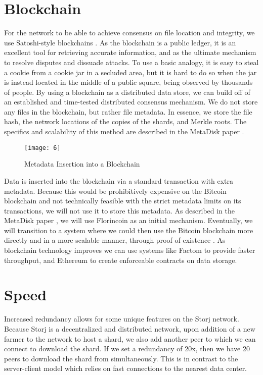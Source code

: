 \documentclass[a4paper,10pt]{article}
\begin{document}
\section{Blockchain}
For the network to be able to achieve consensus on file location and integrity, we use Satoshi-style blockchains \cite{3}. As the blockchain is a public ledger, it is an excellent tool for retrieving accurate information, and as the ultimate mechanism to resolve disputes and dissuade attacks. To use a basic analogy, it is easy to steal a cookie from a cookie jar in a secluded area, but it is hard to do so when the jar is instead located in the middle of a public square, being observed by thousands of people. By using a blockchain as a distributed data store, we can build off of an established and time-tested distributed consensus mechanism. We do not store any files in the blockchain, but rather file metadata. In essence, we store the file hash, the network locations of the copies of the shards, and Merkle roots. The specifics and scalability of this method are described in the MetaDisk paper \cite{1}. \\

\begin{figure}[hbt]
\centering
\texttt{[image: 6]}
\caption{Metadata Insertion into a Blockchain}
\end{figure}

Data is inserted into the blockchain via a standard transaction with extra metadata. Because this would be prohibitively expensive on the Bitcoin blockchain and not technically feasible with the strict metadata limits on its transactions, we will not use it to store this metadata. As described in the MetaDisk paper \cite{1}, we will use Florincoin \cite{6} as an initial mechanism. Eventually, we will transition to a system where we could then use the Bitcoin blockchain more directly and in a more scalable manner, through proof-of-existence \cite{4} \cite{5} \cite{7}. As blockchain technology improves we can use systems like Factom \cite{7} to provide faster throughput, and Ethereum \cite{22} to create enforceable contracts on data storage.

\section{Speed}
Increased redundancy allows for some unique features on the Storj network. Because Storj is a decentralized and distributed network, upon addition of a new farmer to the network to host a shard, we also add another peer to which we can connect to download the shard. If we set a redundancy of 20x, then we have 20 peers to download the shard from simultaneously. This is in contrast to the server-client model which relies on fast connections to the nearest data center.\\
\end{document}
